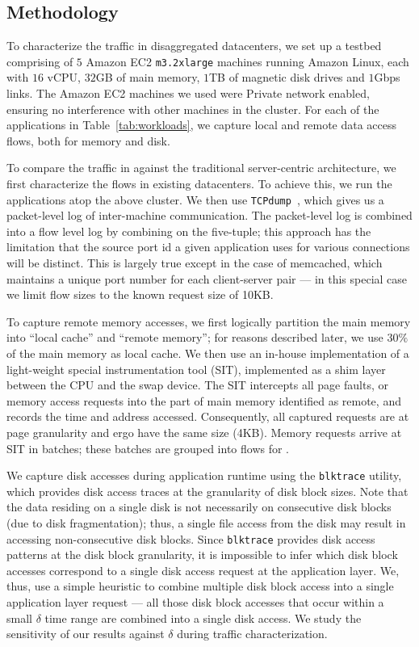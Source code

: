 \subsection{Methodology}
\label{ssec:method1} 
To characterize the traffic in disaggregated datacenters, we set up a testbed comprising of $5$ Amazon EC2 \texttt{m3.2xlarge} machines running Amazon Linux, each with $16$ vCPU, $32$GB of main memory, $1$TB of magnetic disk drives and $1$Gbps links. The Amazon EC2 machines we used were Private network enabled, ensuring no interference with other machines in the cluster. For each of the applications in Table~\ref{tab:workloads}, we capture local and remote data access flows, both for memory and disk.

To compare the traffic in \dis against the traditional server-centric architecture, we first characterize the flows in existing datacenters. To achieve this, we run the applications atop the above cluster. We then use {\tt TCPdump}~\cite{tcpdump}, which gives us a packet-level log of inter-machine communication. The packet-level log is combined into a flow level log by combining on the five-tuple; this approach has the limitation that the source port id a given application uses for various connections will be distinct. This is largely true except in the case of memcached, which maintains a unique port number for each client-server pair --- in this special case we limit flow sizes to the known request size of 10KB.

To capture remote memory accesses, we first logically partition the main memory into ``local cache'' and ``remote memory''; for reasons described later, we use $30\%$ of the main memory as local cache. We then use an in-house implementation of a light-weight special instrumentation tool (SIT), implemented as a shim layer between the CPU and the swap device. The SIT intercepts all page faults, or memory access requests into the part of main memory identified as remote, and records the time and address accessed. Consequently, all captured requests are at page granularity and ergo have the same size (4KB). Memory requests arrive at SIT in batches; these batches are grouped into flows for \dis.

We capture disk accesses during application runtime using the {\tt blktrace} utility, which provides disk access traces at the granularity of disk block sizes. Note that the data residing on a single disk is not necessarily on consecutive disk blocks (due to disk fragmentation); thus, a single file access from the disk may result in accessing non-consecutive disk blocks. Since {\tt blktrace} provides disk access patterns at the disk block granularity, it is impossible to infer which disk block accesses correspond to a single disk access request at the application layer. We, thus, use a simple heuristic to combine multiple disk block access into a single application layer request --- all those disk block accesses that occur within a small $\delta$ time range are combined into a single disk access. We study the sensitivity of our results against $\delta$ during traffic characterization. 

